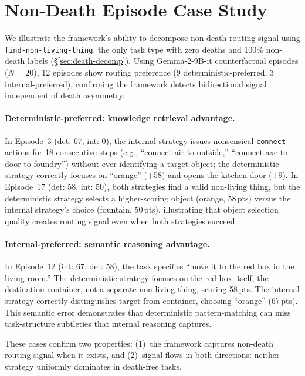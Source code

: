 \documentclass[11pt]{article}
\begin{document}
\section{Non-Death Episode Case Study}
\label{app:non-death-case-study}

We illustrate the framework's ability to decompose non-death routing signal using \texttt{find-non-living-thing}, the only task type with zero deaths and 100\% non-death labels (\S\ref{sec:death-decomp}). Using Gemma-2-9B-it counterfactual episodes ($N{=}20$), 12 episodes show routing preference (9 deterministic-preferred, 3 internal-preferred), confirming the framework detects bidirectional signal independent of death asymmetry.

\paragraph{Deterministic-preferred: knowledge retrieval advantage.}
In Episode~3 (det: 67, int: 0), the internal strategy issues nonsensical \texttt{connect} actions for 18 consecutive steps (e.g., ``connect air to outside,'' ``connect axe to door to foundry'') without ever identifying a target object; the deterministic strategy correctly focuses on ``orange'' (+58) and opens the kitchen door (+9). In Episode~17 (det: 58, int: 50), both strategies find a valid non-living thing, but the deterministic strategy selects a higher-scoring object (orange, 58\,pts) versus the internal strategy's choice (fountain, 50\,pts), illustrating that object selection quality creates routing signal even when both strategies succeed.

\paragraph{Internal-preferred: semantic reasoning advantage.}
In Episode~12 (int: 67, det: 58), the task specifies ``move it to the red box in the living room.'' The deterministic strategy focuses on the red box itself, the destination container, not a separate non-living thing, scoring 58\,pts. The internal strategy correctly distinguishes target from container, choosing ``orange'' (67\,pts). This semantic error demonstrates that deterministic pattern-matching can miss task-structure subtleties that internal reasoning captures.

These cases confirm two properties: (1)~the framework captures non-death routing signal when it exists, and (2)~signal flows in both directions: neither strategy uniformly dominates in death-free tasks.
\end{document}
